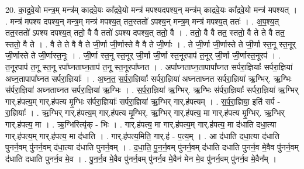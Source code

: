 \documentclass[17pt]{extarticle}
\begin{document}
20. का॒द्र॒वे॒यो मन्त्र॒म् मन्त्र॑म् काद्रवे॒यः का᳚द्रवे॒यो मन्त्र॑ मपश्यदपश्य॒न् मन्त्र॑म् काद्रवे॒यः का᳚द्रवे॒यो मन्त्र॑ मपश्यत् । . मन्त्र॑ मपश्य दपश्य॒न् मन्त्र॒म् मन्त्र॑ मपश्य॒त् तत॒स्ततो॑ ऽपश्य॒न् मन्त्र॒म् मन्त्र॑ मपश्य॒त् ततः॑ । . अ॒प॒श्य॒त् तत॒स्ततो॑ ऽपश्य दपश्य॒त् ततो॒ वै वै ततो॑ ऽपश्य दपश्य॒त् ततो॒ वै । . ततो॒ वै वै तत॒ स्ततो॒ वै ते ते वै तत॒ स्ततो॒ वै ते । . वै ते ते वै वै ते जी॒र्णा जी॒र्णास्ते वै वै ते जी॒र्णाः । . ते जी॒र्णा जी॒र्णास्ते ते जी॒र्णा स्त॒नू स्त॒नूर् जी॒र्णास्ते ते जी॒र्णास्त॒नूः । . जी॒र्णा स्त॒नू स्त॒नूर् जी॒र्णा जी॒र्णा स्त॒नूरपाप॑ त॒नूर् जी॒र्णा जी॒र्णास्त॒नूरप॑ । . त॒नूरपाप॑ त॒नू स्त॒नू रपा᳚घ्नताघ्न॒ताप॑ त॒नू स्त॒नूरपा᳚घ्नत । . अपा᳚घ्नताघ्न॒तापापा᳚घ्नत सर्परा॒ज्ञियाः᳚ सर्परा॒ज्ञिया॑ अघ्न॒तापापा᳚घ्नत सर्परा॒ज्ञियाः᳚ । . अ॒घ्न॒त॒ स॒र्प॒रा॒ज्ञियाः᳚ सर्परा॒ज्ञिया॑ अघ्नताघ्नत सर्परा॒ज्ञिया॑ ऋ॒ग्भिर्. ऋ॒ग्भिः स॑र्परा॒ज्ञिया॑ अघ्नताघ्नत सर्परा॒ज्ञिया॑ ऋ॒ग्भिः । . स॒र्प॒रा॒ज्ञिया॑ ऋ॒ग्भिर्. ऋ॒ग्भिः स॑र्परा॒ज्ञियाः᳚ सर्परा॒ज्ञिया॑ ऋ॒ग्भिर् गार्.ह॑पत्य॒म् गार्.ह॑पत्य मृ॒ग्भिः स॑र्परा॒ज्ञियाः᳚ सर्परा॒ज्ञिया॑ ऋ॒ग्भिर् गार्.ह॑पत्यम् । . स॒र्प॒रा॒ज्ञिया॒ इति॑ सर्प - रा॒ज्ञियाः᳚ । . ऋ॒ग्भिर् गार्.ह॑पत्य॒म् गार्.ह॑पत्य मृ॒ग्भिर्. ऋ॒ग्भिर् गार्.ह॑पत्य॒ मा गार्.ह॑पत्य मृ॒ग्भिर्. ऋ॒ग्भिर् गार्.ह॑पत्य॒ मा । . ऋ॒ग्भिरित्यृ॑क् - भिः । . गार्.ह॑पत्य॒ मा गार्.ह॑पत्य॒म् गार्.ह॑पत्य॒ मा द॑धाति दधा॒त्या गार्.ह॑पत्य॒म् गार्.ह॑पत्य॒ मा द॑धाति । . गार्.ह॑पत्य॒मिति॒ गार्.ह॑ - प॒त्य॒म् । . आ द॑धाति दधा॒त्या द॑धाति पुनर्न॒वम् पु॑नर्न॒वम् द॑धा॒त्या द॑धाति पुनर्न॒वम् । . द॒धा॒ति॒ पु॒न॒र्न॒वम् पु॑नर्न॒वम् द॑धाति दधाति पुनर्न॒व मे॒वैव पु॑नर्न॒वम् द॑धाति दधाति पुनर्न॒व मे॒व । . पु॒न॒र्न॒व मे॒वैव पु॑नर्न॒वम् पु॑नर्न॒व मे॒वैन॑ मेन मे॒व पु॑नर्न॒वम् पु॑नर्न॒व मे॒वैन᳚म् । \newline
\end{document}
